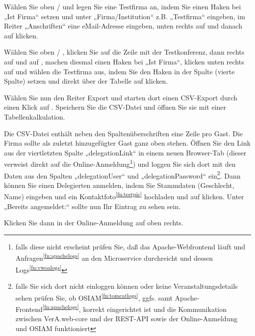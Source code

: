 Wählen Sie oben  / 
und legen Sie eine Testfirma an, indem Sie einen Haken bei „Ist Firma“
setzen und unter „Firma/Institution“ z.B. „Testfirma“ eingeben, im
Reiter „Anschriften“ eine eMail-Adresse eingeben, unten
rechts auf  und danach auf
 klicken.

Wählen Sie oben  /
, klicken Sie auf die Zeile mit
der Testkonferenz, dann rechts auf 
und auf , machen diesmal einen Haken bei
„Ist Firma“, klicken unten rechts auf  und wählen
die Testfirma aus, indem Sie den Haken in der Spalte 
(vierte Spalte) setzen und direkt über der Tabelle auf
 klicken.

Wählen Sie nun den Reiter Export und starten dort einen CSV-Export
durch einen Klick auf .
Speichern Sie die CSV-Datei und öffnen Sie sie mit einer Tabellenkalkulation.

Die CSV-Datei enthält neben den Spaltenüberschriften eine Zeile pro Gast.
Die Firma sollte als zuletzt hinzugefügter Gast ganz oben stehen.
Öffnen Sie den Link aus der viertletzten Spalte
„delegationLink“ in einem neuen Browser-Tab
(dieser verweist direkt auf die Online-Anmeldung\Hair\footnote{falls
diese nicht erscheint prüfen Sie, daß das Apache-Webfrontend läuft und
Anfragen\Hair\textsuperscript{\ref{fn:apachelogs}} an den Microservice
durchreicht und dessen Logs\Hair\textsuperscript{\ref{fn:vwoalogs}}})
und loggen Sie sich dort mit den Daten aus den Spalten „delegationUser“
und „delegationPassword“ ein\Hair\footnote{\label{fn:inttst-osiam}falls Sie sich
dort nicht einloggen können oder keine Veranstaltungsdetails sehen
prüfen Sie, ob OSIAM\Hair\textsuperscript{\ref{fn:tomcatlogs}}, ggfs.
samt Apache-Frontend\Hair\textsuperscript{\ref{fn:apachelogs}}, korrekt
eingerichtet ist und die Kommunikation zwischen VerA.web-core und der
REST-API sowie der Online-Anmeldung und OSIAM funktioniert}. Dann können
Sie einen Delegierten anmelden, indem Sie Stammdaten (Geschlecht, Name)
eingeben und ein Kontaktfoto\Hair\textsuperscript{\ref{fn:testpic}}
hochladen und auf  klicken.
Unter „Bereits angemeldet:“ sollte nun Ihr Eintrag zu sehen sein.

Klicken Sie dann in der Online-Anmeldung auf 
oben rechts.

